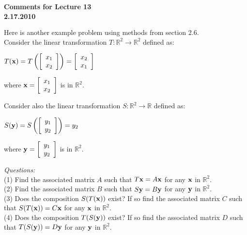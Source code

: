 \documentclass[12pt]{article}
\begin{document}
\begin{center}
{\large \bf Comments for Lecture 13}\\
\bf{2.17.2010}
\end{center}

\noindent Here is another example problem using methods from section 2.6.\\

  Consider the linear transformation $T{:}\mathbb{R}^2 \to \mathbb{R}^2$ defined as:

\begin{center}
$T({\bf x})=T\left(  \left[ \begin{array}{c} x_1 \\ x_2  \end{array} \right] \right)=\left[ \begin{array}{c} x_2 \\ x_1  \end{array} \right]$
\end{center}

where ${\bf x}=\left[ \begin{array}{c} x_1 \\ x_2  \end{array} \right]$ is in $\mathbb{R}^2$.

Consider also the linear transformation $S{:}\mathbb{R}^2 \to \mathbb{R}$ defined as:

\begin{center}
$S({\bf y})=S\left(  \left[ \begin{array}{c} y_1 \\ y_2  \end{array} \right] \right)=y_2$
\end{center}

where ${\bf y}=\left[ \begin{array}{c} y_1 \\ y_2  \end{array} \right]$ is in $\mathbb{R}^2$.

{\it Questions:}\\
\noindent(1) Find the associated matrix $A$ such that $T{\bf x} = A{\bf x}$ for any ${\bf x}$ in $\mathbb{R}^2$.\\
\noindent(2) Find the associated matrix $B$ such that $S{\bf y} = B{\bf y}$ for any ${\bf y}$ in $\mathbb{R}^2$.\\
\noindent(3) Does the composition $S(T({\bf x}))$ exist?  If so find the associated matrix $C$ such that $S(T({\bf x})) = C{\bf x}$ for any ${\bf x}$ in $\mathbb{R}^2$.\\
\noindent(4) Does the composition $T(S({\bf y}))$ exist?  If so find the associated matrix $D$ such that $T(S({\bf y})) = D{\bf y}$ for any ${\bf y}$ in $\mathbb{R}^2$.\\
\end{document}
